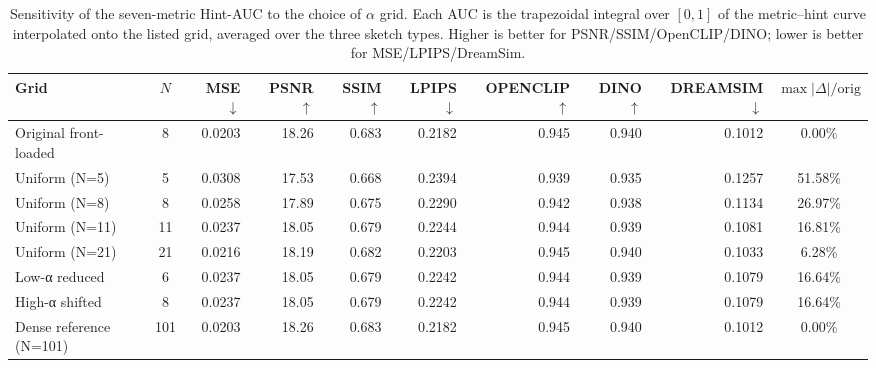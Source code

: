 \begin{table}[t]
  \centering
  \caption{Sensitivity of the seven-metric Hint-AUC to the choice of $\alpha$ grid. Each AUC is the trapezoidal integral over $[0,1]$ of the metric--hint curve interpolated onto the listed grid, averaged over the three sketch types. Higher is better for PSNR/SSIM/OpenCLIP/DINO; lower is better for MSE/LPIPS/DreamSim.}
  \label{tab:S-R2-1-B-2-7m}
  \small
  \begin{tabular}{l c rrrrrrr c}
    \toprule
    Grid & $N$ & MSE $\downarrow$ & PSNR $\uparrow$ & SSIM $\uparrow$ & LPIPS $\downarrow$ & OPENCLIP $\uparrow$ & DINO $\uparrow$ & DREAMSIM $\downarrow$ & $\max\!\big|\Delta\big|/\mathrm{orig}$ \\
    \midrule
    Original front-loaded      &   8 & 0.0203 & 18.26 & 0.683 & 0.2182 & 0.945 & 0.940 & 0.1012 &  0.00\% \\
    Uniform (N=5)              &   5 & 0.0308 & 17.53 & 0.668 & 0.2394 & 0.939 & 0.935 & 0.1257 & 51.58\% \\
    Uniform (N=8)              &   8 & 0.0258 & 17.89 & 0.675 & 0.2290 & 0.942 & 0.938 & 0.1134 & 26.97\% \\
    Uniform (N=11)             &  11 & 0.0237 & 18.05 & 0.679 & 0.2244 & 0.944 & 0.939 & 0.1081 & 16.81\% \\
    Uniform (N=21)             &  21 & 0.0216 & 18.19 & 0.682 & 0.2203 & 0.945 & 0.940 & 0.1033 &  6.28\% \\
    Low-α reduced              &   6 & 0.0237 & 18.05 & 0.679 & 0.2242 & 0.944 & 0.939 & 0.1079 & 16.64\% \\
    High-α shifted             &   8 & 0.0237 & 18.05 & 0.679 & 0.2242 & 0.944 & 0.939 & 0.1079 & 16.64\% \\
    Dense reference (N=101)    & 101 & 0.0203 & 18.26 & 0.683 & 0.2182 & 0.945 & 0.940 & 0.1012 &  0.00\% \\
    \bottomrule
  \end{tabular}
\end{table}
